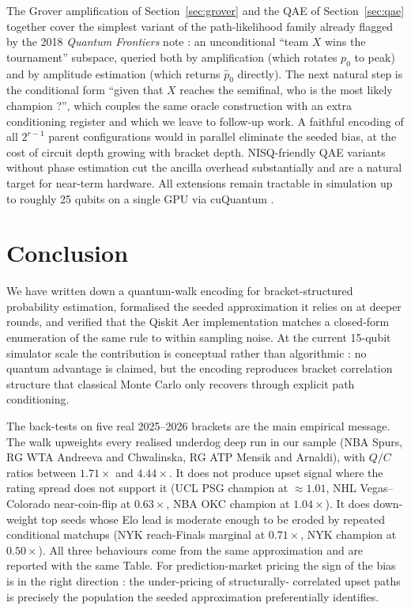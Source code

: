 \documentclass[11pt]{article}
\begin{document}
The Grover amplification of Section~\ref{sec:grover} and the QAE of
Section~\ref{sec:qae} together cover the simplest variant of the
path-likelihood family already flagged by the 2018 \emph{Quantum
Frontiers} note \cite{quantumfrontiers_wc_2018} : an unconditional
``team $X$ wins the tournament'' subspace, queried both by
amplification (which rotates $p_0$ to peak) and by amplitude
estimation (which returns $\hat p_0$ directly). The next natural
step is the conditional form ``given that $X$ reaches the semifinal,
who is the most likely champion ?'', which couples the same oracle
construction with an extra conditioning register and which we leave
to follow-up work. A faithful encoding of all $2^{r-1}$ parent
configurations would in parallel eliminate the seeded bias, at the
cost of circuit depth growing with bracket depth. NISQ-friendly QAE
variants without phase estimation \cite{suzuki2020amplitude} cut the
ancilla overhead substantially and are a natural target for near-term
hardware. All extensions remain tractable in simulation up to roughly
25 qubits on a single GPU via cuQuantum
\cite{cuquantum_benchmark_2023}.

\FloatBarrier
\section{Conclusion}

We have written down a quantum-walk encoding for bracket-structured
probability estimation, formalised the seeded approximation it
relies on at deeper rounds, and verified that the Qiskit Aer
implementation matches a closed-form enumeration of the same rule
to within sampling noise. At the current 15-qubit simulator scale
the contribution is conceptual rather than algorithmic : no quantum
advantage is claimed, but the encoding reproduces bracket
correlation structure that classical Monte Carlo only recovers
through explicit path conditioning.

The back-tests on five real 2025--2026 brackets are the main
empirical message. The walk upweights every realised underdog deep
run in our sample (NBA Spurs, RG WTA Andreeva and Chwalinska, RG ATP
Mensik and Arnaldi), with $Q/C$ ratios between $1.71\times$ and
$4.44\times$. It does not produce upset signal where the rating
spread does not support it (UCL PSG champion at $\approx 1.01$, NHL
Vegas--Colorado near-coin-flip at $0.63\times$, NBA OKC champion at
$1.04\times$). It does down-weight top seeds whose Elo lead is
moderate enough to be eroded by repeated conditional matchups
(NYK reach-Finals marginal at $0.71\times$, NYK champion at
$0.50\times$). All three behaviours come from the same approximation
and are reported with
the same Table. For prediction-market pricing the sign of the bias
is in the right direction : the under-pricing of structurally-
correlated upset paths is precisely the population the seeded
approximation preferentially identifies.
\end{document}
